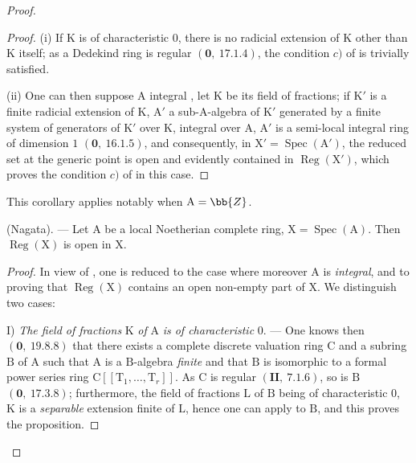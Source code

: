 \begin{proof}
\begin{proof}
(i) If $\mathrm{K}$ is of characteristic $0$, there is no radicial extension of $\mathrm{K}$ other than $\mathrm{K}$
itself; as a Dedekind ring is regular $(\mathbf{0},~17.1.4)$, the condition $c)$
of  is trivially satisfied.

(ii) One can then suppose $\mathrm{A}$ integral , let $\mathrm{K}$ be its field of fractions; if $\mathrm{K}'$ is
a finite radicial extension of $\mathrm{K}$, $\mathrm{A}'$ a sub-$\mathrm{A}$-algebra of $\mathrm{K}'$ generated by a
finite system of generators of $\mathrm{K}'$ over $\mathrm{K}$, integral over $\mathrm{A}$, $\mathrm{A}'$ is a semi-local integral ring
of dimension $1$ $(\mathbf{0},~16.1.5)$, and consequently, in $\mathrm{X}'=\operatorname{Spec}(\mathrm{A}')$, the reduced set at the
generic point is open and evidently contained in $\operatorname{Reg}(\mathrm{X}')$, which proves the
condition $c)$ of  in this case.
\end{proof}

This corollary applies notably when $\mathrm{A}=\bb{Z}$.

\begin{theorem}[6.12.7]
\label{IV.6.12.7}
\textnormal{(Nagata).} --- Let $\mathrm{A}$ be a local Noetherian complete ring,
$\mathrm{X}=\operatorname{Spec}(\mathrm{A})$. Then $\operatorname{Reg}(\mathrm{X})$ is open in $\mathrm{X}$.
\end{theorem}

\begin{proof}
In view of , one is reduced to the case where moreover $\mathrm{A}$ is \emph{integral}, and to
proving that $\operatorname{Reg}(\mathrm{X})$ contains an open non-empty part of $\mathrm{X}$. We distinguish
two cases:


I) \emph{The field of fractions} $\mathrm{K}$ \emph{of} $\mathrm{A}$ \emph{is of characteristic} $0$. --- One knows then $(\mathbf{0},~19.8.8)$
that there exists a complete discrete valuation ring $\mathrm{C}$ and a subring $\mathrm{B}$ of $\mathrm{A}$ such
that $\mathrm{A}$ is a $\mathrm{B}$-algebra \emph{finite} and that $\mathrm{B}$ is isomorphic to a formal power series ring
$\mathrm{C}[[\mathrm{T}_1,\ldots,\mathrm{T}_r]]$. As $\mathrm{C}$ is regular $(\mathbf{II},~7.1.6)$, so is $\mathrm{B}$ $(\mathbf{0},~17.3.8)$;
furthermore, the field of fractions $\mathrm{L}$ of $\mathrm{B}$ being of characteristic $0$, $\mathrm{K}$ is a \emph{separable} extension
finite of $\mathrm{L}$, hence one can apply  to $\mathrm{B}$, and this proves the
proposition.


\end{proof}
\end{proof}
